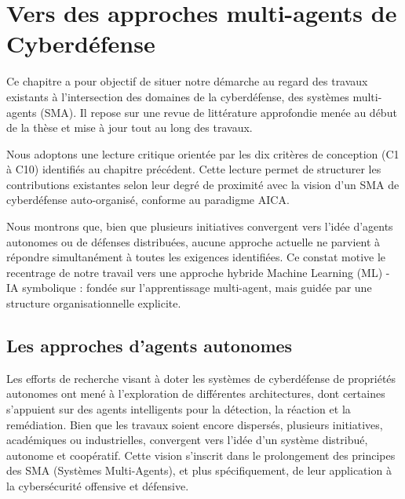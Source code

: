 \documentclass[ twoside,openright,titlepage,numbers=noenddot,headinclude,%
                footinclude=true,cleardoublepage=empty,abstractoff, %
                BCOR=5mm,paper=a4,fontsize=11pt,%
                french,american,%
                ]{scrreprt}
\begin{document}
\chapter{Vers des approches multi-agents de Cyberdéfense}

\noindent
Ce chapitre a pour objectif de situer notre démarche au regard des travaux existants à l'intersection des domaines de la cyberdéfense, des systèmes multi-agents (SMA). Il repose sur une revue de littérature approfondie menée au début de la thèse et mise à jour tout au long des travaux.

Nous adoptons une lecture critique orientée par les dix critères de conception (C1 à C10) identifiés au chapitre précédent. Cette lecture permet de structurer les contributions existantes selon leur degré de proximité avec la vision d'un SMA de cyberdéfense auto-organisé, conforme au paradigme AICA.

Nous montrons que, bien que plusieurs initiatives convergent vers l'idée d'agents autonomes ou de défenses distribuées, aucune approche actuelle ne parvient à répondre simultanément à toutes les exigences identifiées. Ce constat motive le recentrage de notre travail vers une approche hybride Machine Learning (ML) - IA symbolique : fondée sur l'apprentissage multi-agent, mais guidée par une structure organisationnelle explicite.

\section{Les approches d'agents autonomes}\label{sec:revue-cyberdef-agent}

Les efforts de recherche visant à doter les systèmes de cyberdéfense de propriétés autonomes ont mené à l'exploration de différentes architectures, dont certaines s'appuient sur des agents intelligents pour la détection, la réaction et la remédiation. Bien que les travaux soient encore dispersés, plusieurs initiatives, académiques ou industrielles, convergent vers l'idée d'un système distribué, autonome et coopératif. Cette vision s'inscrit dans le prolongement des principes des SMA (Systèmes Multi-Agents), et plus spécifiquement, de leur application à la cybersécurité offensive et défensive.
\end{document}
